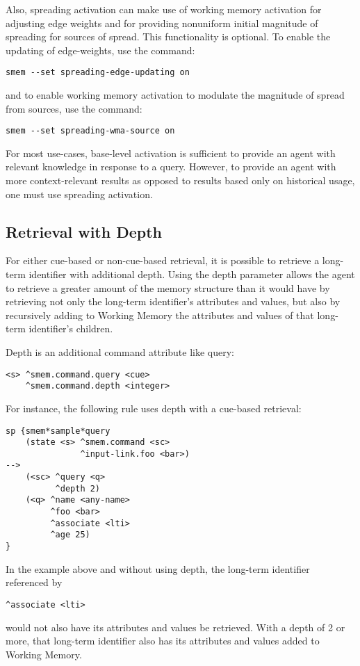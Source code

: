 Also, spreading activation can make use of working memory activation for adjusting edge weights and for providing nonuniform initial magnitude of spreading for sources of spread. This functionality is optional. To enable the updating of edge-weights, use the command: \begin{verbatim}smem --set spreading-edge-updating on
\end{verbatim} and to enable working memory activation to modulate the magnitude of spread from sources, use the command: \begin{verbatim}smem --set spreading-wma-source on
\end{verbatim}

For most use-cases, base-level activation is sufficient to provide an agent with relevant knowledge in response to a query. However, to provide an agent with more context-relevant results as opposed to results based only on historical usage, one must use spreading activation.

\subsection{Retrieval with Depth}
For either cue-based or non-cue-based retrieval, it is possible to retrieve a long-term identifier with additional depth. Using the depth parameter allows the agent to retrieve a greater amount of the memory structure than it would have by retrieving not only the long-term identifier's attributes and values, but also by recursively adding to Working Memory the attributes and values of that long-term identifier's children.

Depth is an additional command attribute like query:
\begin{verbatim}
<s> ^smem.command.query <cue>
    ^smem.command.depth <integer>
\end{verbatim}

For instance, the following rule uses depth with a cue-based retrieval:
\begin{verbatim}
sp {smem*sample*query
    (state <s> ^smem.command <sc>
               ^input-link.foo <bar>)
-->
    (<sc> ^query <q>
          ^depth 2)
    (<q> ^name <any-name>
         ^foo <bar>
         ^associate <lti>
         ^age 25)
}
\end{verbatim}

In the example above and without using depth, the long-term identifier referenced by
\begin{verbatim}
^associate <lti>
\end{verbatim}
would not also have its attributes and values be retrieved. With a depth of 2 or more, that long-term identifier also has its attributes and values added to Working Memory.

